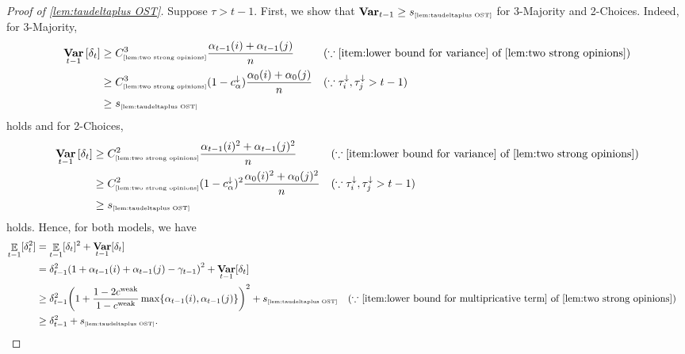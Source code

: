 \documentclass[letterpaper,11pt]{article}
\DeclareMathOperator*{\E}{\mathbb{E}}
\DeclareMathOperator*{\Var}{\mathbf{Var}}
\newcommand{\constref}[1]{C_{\mbox{\tiny\ref{#1}}}}
\newcommand{\varianceref}[1]{\variance_{\mbox{\tiny\ref{#1}}}}
\newcommand{\alphanorm}{\gamma}
\newcommand{\cweak}{c^{\mathrm{weak}}}
\newcommand{\calphadown}{c^{\downarrow}_\alpha}
\newcommand{\variance}{s}
\newcommand{\tauidown}{\tau^{\downarrow}_i}
\newcommand{\taujdown}{\tau^{\downarrow}_j}
\begin{document}
\begin{proof}[Proof of \cref{lem:taudeltaplus OST}]
    Suppose $\tau>t-1$.
    First, we show that $\Var_{t-1}\geq \varianceref{lem:taudeltaplus OST}$ for 3-Majority and 2-Choices.
    Indeed, for 3-Majority, 
    \begin{align*}
        \Var_{t-1}\qty[\delta_t]
        &\geq \constref{lem:two strong opinions}^3\frac{\alpha_{t-1}(i)+\alpha_{t-1}(j)}{n} &&(\because \textrm{\cref{item:lower bound for variance} of \cref{lem:two strong opinions}}) \nonumber\\
        &\geq \constref{lem:two strong opinions}^3(1-\calphadown)\frac{\alpha_{0}(i)+\alpha_{0}(j)}{n} &&(\because \tauidown,\taujdown>t-1) \nonumber\\
        &\geq \varianceref{lem:taudeltaplus OST}
    \end{align*}
    holds and for 2-Choices, 
    \begin{align*}
        \Var_{t-1}\qty[\delta_t]
        &\geq \constref{lem:two strong opinions}^2\frac{\alpha_{t-1}(i)^2+\alpha_{t-1}(j)^2}{n} &&(\because \textrm{\cref{item:lower bound for variance} of \cref{lem:two strong opinions}}) \nonumber\\
        &\geq \constref{lem:two strong opinions}^2(1-\calphadown)^2\frac{\alpha_{0}(i)^2+\alpha_{0}(j)^2}{n} &&(\because \tauidown,\taujdown>t-1) \nonumber\\
        &\geq \varianceref{lem:taudeltaplus OST}
    \end{align*}
    holds.
    Hence, for both models, we have
    \begin{align*}
        \E_{t-1}[\delta_t^2]
        &=\E_{t-1}[\delta_t]^2+\Var_{t-1}[\delta_t]\\
        &=\delta_{t-1}^2\qty(1+\alpha_{t-1}(i)+\alpha_{t-1}(j)-\alphanorm_{t-1})^2+\Var_{t-1}[\delta_t]\\
        &\geq \delta_{t-1}^2\qty(1+\frac{1-2\cweak}{1-\cweak}\max\{\alpha_{t-1}(i),\alpha_{t-1}(j)\})^2+\varianceref{lem:taudeltaplus OST} &&(\text{$\because$ \cref{item:lower bound for multipricative term} of \cref{lem:two strong opinions}})\\
        &\geq \delta_{t-1}^2+\varianceref{lem:taudeltaplus OST}.
    \end{align*}

\end{proof}
\end{document}
